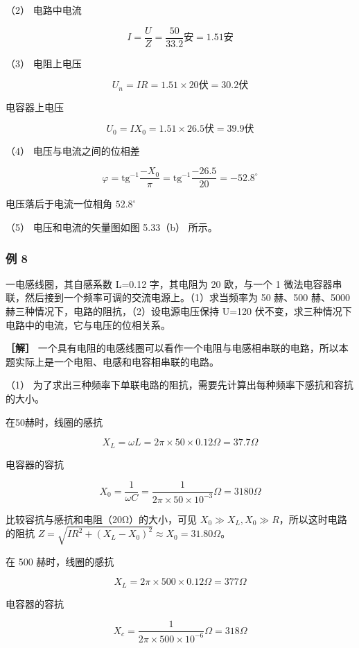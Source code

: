 （2） 电路中电流

\[
I = \frac{U}{Z} = \frac{50}{33.2} \text{安} = 1.51 \text{安}
\]

（3） 电阻上电压

\[
U_{n} = I R = 1.51 \times 20 \text{伏} = 30.2 \text{伏}
\]

电容器上电压

\[
U_{0} = I X_{0} = 1.51 \times 26.5 \text{伏} = 39.9 \text{伏}
\]

（4） 电压与电流之间的位相差

\[
\varphi = \mathrm{tg}^{- 1} \frac{- X_{0}}{\pi} = \mathrm{tg}^{- 1} \frac{- 26.5}{20} = - 52.8^{\circ}
\]

电压落后于电流一位相角 \(52.8^{\circ}\)

（5） 电压和电流的矢量图如图 5.33（b） 所示。

\subsubsection{例 8}\label{ux4f8b-8-2}

一电感线圈，其自感系数 L=0.12 字，其电阻为 20 欧，与一个 1
微法电容器串联，然后接到一个频率可调的交流电源上。（1）求当频率为 50
赫、500 赫、5000 赫三种情况下，电路的阻抗，（2）设电源电压保持 U=120
伏不变，求三种情况下电路中的电流，它与电压的位相关系。

\textbf{［解］}
一个具有电阻的电感线圈可以看作一个电阻与电感相串联的电路，所以本题实际上是一个电阻、电感和电容相串联的电路。

（1）
为了求出三种频率下单联电路的阻抗，需要先计算出每种频率下感抗和容抗的大小。

在50赫时，线圈的感抗

\[
X_{L} = \omega L = 2 \pi \times 50 \times 0.12 \Omega = 37.7 \Omega
\]

电容器的容抗

\[
X_{0} = \frac{1}{\omega C} = \frac{1}{2 \pi \times 50 \times 10^{- 3}} \Omega = 3180 \Omega
\]

比较容抗与感抗和电阻（20Ω）的大小，可见
\(X_{0} \gg X_{L}, X_{0} \gg R\)，所以这时电路的阻抗
\(Z = \sqrt{IR^{2} + (X_{L} - X_{0})^{2}} \approx X_{0} = 31.80\Omega\)。

在 500 赫时，线圈的感抗

\[
X_{L} = 2 \pi \times 500 \times 0.12 \Omega = 377 \Omega
\]

电容器的容抗

\[
X_{c} = \frac{1}{2 \pi \times 500 \times 10^{- 6}} \Omega = 318 \Omega
\]

